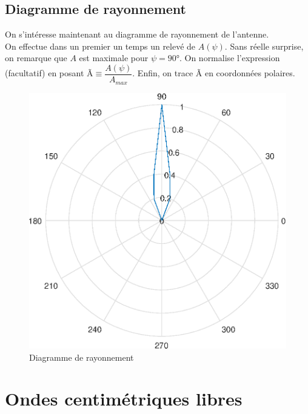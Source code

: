 \documentclass[12pt,a4paper]{article}
\begin{document}
	\subsection{Diagramme de rayonnement}
	On s'intéresse maintenant au diagramme de rayonnement de l'antenne.\\
	On effectue dans un premier un temps un relevé de $A(\psi)$. Sans réelle surprise, on remarque que $A$ est maximale pour $\psi=90$°. On normalise l'expression (facultatif) en posant \~{A}$\equiv\dfrac{A(\psi)}{A_{max}}$. Enfin, on trace \~{A} en coordonnées polaires.\\
\begin{figure}[h]
	\centering
	\caption[Diagramme de rayonnment]{Diagramme de rayonnement}
	\label{fig:rayonnement}
	\includegraphics[scale=0.5]{matlab/Rayonnement}
\end{figure}

	
	\section{Ondes centimétriques libres}
\end{document}
